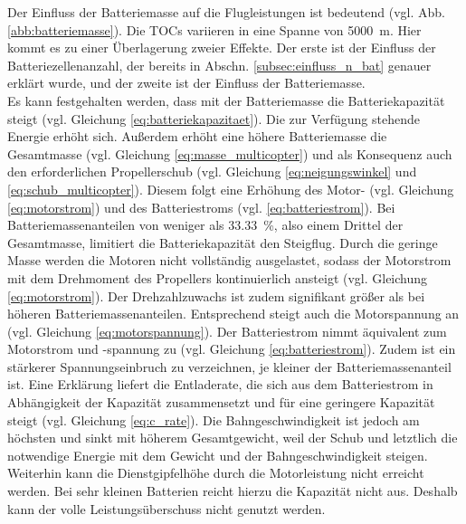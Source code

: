 Der Einfluss der Batteriemasse auf die Flugleistungen ist bedeutend (vgl. Abb. \ref{abb:batteriemasse}). Die TOCs variieren in eine Spanne von \SI{5000}{m}. Hier kommt es zu einer Überlagerung zweier Effekte. Der erste ist der Einfluss der Batteriezellenanzahl, der bereits in Abschn. \ref{subsec:einfluss_n_bat} genauer erklärt wurde, und der zweite ist der Einfluss der Batteriemasse. \\
Es kann festgehalten werden, dass mit der Batteriemasse die Batteriekapazität steigt (vgl. Gleichung \eqref{eq:batteriekapazitaet}). Die zur Verfügung stehende Energie erhöht sich. Außerdem erhöht eine höhere Batteriemasse die Gesamtmasse (vgl. Gleichung \eqref{eq:masse_multicopter}) und als Konsequenz auch den erforderlichen Propellerschub (vgl. Gleichung \eqref{eq:neigungswinkel} und \eqref{eq:schub_multicopter}). Diesem folgt eine Erhöhung des Motor- (vgl. Gleichung \eqref{eq:motorstrom}) und des Batteriestroms (vgl. \eqref{eq:batteriestrom}).
Bei Batteriemassenanteilen von weniger als \SI{33,33}{\%}, also einem Drittel der Gesamtmasse, limitiert die Batteriekapazität den Steigflug. Durch die geringe Masse werden die Motoren nicht vollständig ausgelastet, sodass der Motorstrom mit dem Drehmoment des Propellers kontinuierlich ansteigt (vgl. Gleichung \eqref{eq:motorstrom}). Der Drehzahlzuwachs ist zudem signifikant größer als bei höheren Batteriemassenanteilen. Entsprechend steigt auch die Motorspannung an (vgl. Gleichung \eqref{eq:motorspannung}). Der Batteriestrom nimmt äquivalent zum Motorstrom und -spannung zu (vgl. Gleichung \eqref{eq:batteriestrom}).
Zudem ist ein stärkerer Spannungseinbruch zu verzeichnen, je kleiner der Batteriemassenanteil ist. Eine Erklärung liefert die Entladerate, die sich aus dem Batteriestrom in Abhängigkeit der Kapazität zusammensetzt und für eine geringere Kapazität steigt (vgl. Gleichung \eqref{eq:c_rate}). Die Bahngeschwindigkeit ist jedoch am höchsten und sinkt mit höherem Gesamtgewicht, weil der Schub und letztlich die notwendige Energie mit dem Gewicht und der Bahngeschwindigkeit steigen. Weiterhin kann die Dienstgipfelhöhe durch die Motorleistung nicht erreicht werden. Bei sehr kleinen Batterien reicht hierzu die Kapazität nicht aus. Deshalb kann der volle Leistungsüberschuss nicht genutzt werden. \\
